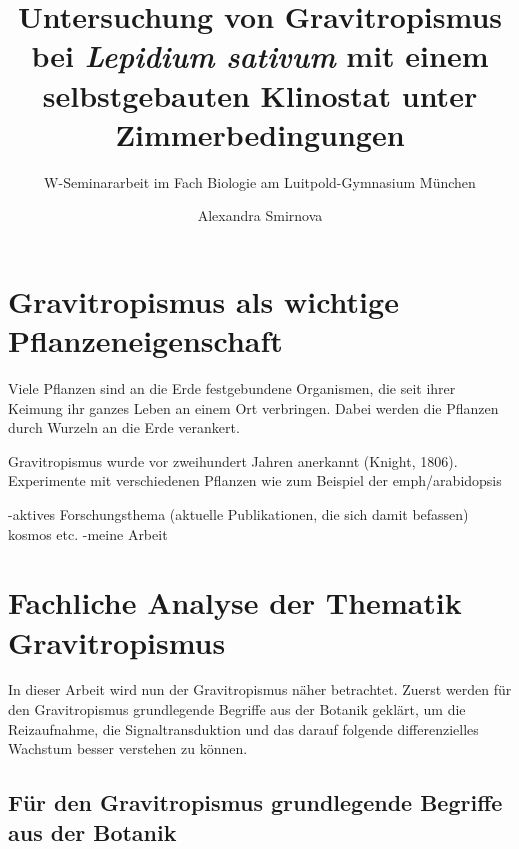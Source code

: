 \documentclass[
a4paper, 
11pt, 
ngerman,
listof=totoc,
bibliography=totocnumbered,
abstracton
]{scrreprt}
\title{Untersuchung von Gravitropismus bei \emph{Lepidium sativum} mit einem selbstgebauten Klinostat unter Zimmerbedingungen}
\subtitle{W-Seminararbeit im Fach Biologie am Luitpold-Gymnasium München}
\author{Alexandra Smirnova}
\begin{document}
	
\begingroup
\renewcommand*{\chapterpagestyle}{empty}
\pagestyle{empty}
\maketitle
\tableofcontents
\clearpage
\endgroup
	
\renewcommand\abstractname{Abstract}
\begin{abstract}

	
\end{abstract}


\chapter{Gravitropismus als wichtige Pflanzeneigenschaft}

Viele Pflanzen sind an die Erde festgebundene Organismen, die seit ihrer Keimung ihr ganzes Leben an einem Ort verbringen. Dabei werden die Pflanzen durch Wurzeln an die Erde verankert. 

Gravitropismus wurde vor zweihundert Jahren anerkannt (Knight, 1806). Experimente mit verschiedenen Pflanzen wie zum Beispiel der emph/{arabidopsis}

-aktives Forschungsthema (aktuelle Publikationen, die sich damit befassen) kosmos etc.
-meine Arbeit







\chapter{Fachliche Analyse der Thematik Gravitropismus}

In dieser Arbeit wird nun der Gravitropismus näher betrachtet. Zuerst werden für den Gravitropismus grundlegende Begriffe aus der Botanik geklärt, um die Reizaufnahme, die Signaltransduktion und das darauf folgende differenzielles Wachstum besser verstehen zu können.  



\section{Für den Gravitropismus grundlegende Begriffe aus der Botanik}
\end{document}
